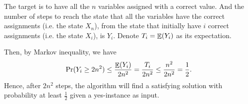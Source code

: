 \documentclass{homework}
\begin{document}
\begin{solution}
  The target is to have all the $n$ variables assigned with a correct value.
  And the number of steps to reach the state that all the variables
  have the correct assignments (i.e. the state $X_n$), from the state that initially have $i$
  correct assignments (i.e. the state $X_i$), is $Y_i$. Denote $T_i = \mathop{\mathbb{E}}\displaylimits(Y_i)$
  as its expectation.

  Then, by Markov inequality, we have
  \begin{equation*}
    \Pr(Y_i \ge 2n^2) \le \frac{\mathop{\mathbb{E}}\displaylimits(Y_i)}{2n^2} = \frac{T_i}{2n^2} \le \frac{n^2}{2n^2} = \frac{1}{2}.
  \end{equation*}
  Hence, after $2n^2$ steps, the algorithm will find a satisfying solution
  with probability at least $\frac{1}{2}$ given a yes-instance as input.

\end{solution}
\end{document}
